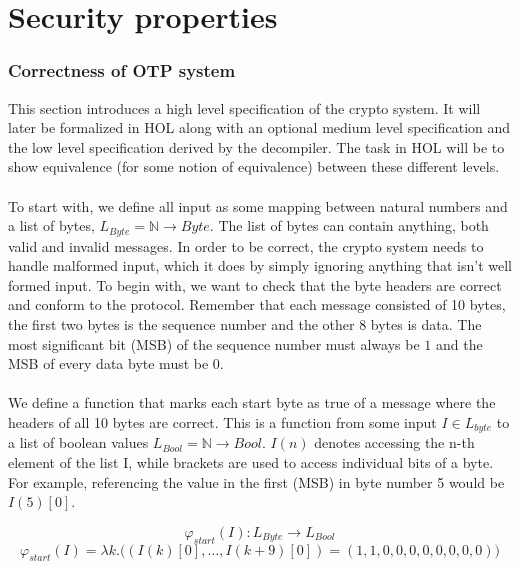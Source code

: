 \documentclass[fleqn]{kththesis}
\begin{document}
\section{Security properties}

\subsubsection{Correctness of OTP system}
This section introduces a high level specification of the crypto system. It will later be formalized in HOL along with an optional medium level specification and the low level specification derived by the decompiler. The task in HOL will be to show equivalence (for some notion of equivalence) between these different levels. 

\paragraph{}
To start with, we define all input as some mapping between natural numbers and a list of bytes, $L_{Byte} = \mathbb{N} \rightarrow Byte$. The list of bytes can contain anything, both valid and invalid messages. In order to be correct, the crypto system needs to handle malformed input, which it does by simply ignoring anything that isn't well formed input. To begin with, we want to check that the byte headers are correct and conform to the protocol. Remember that each message consisted of 10 bytes, the first two bytes is the sequence number and the other 8 bytes is data. The most significant bit (MSB) of the sequence number must always be $1$ and the MSB of every data byte must be $0$.

\paragraph{}
We define a function that marks each start byte as true of a message where the headers of all 10 bytes are correct. This is a function from some input $I \in L_{byte}$ to a list of boolean values $L_{Bool} = \mathbb{N} \rightarrow Bool$. $I(n)$ denotes accessing the n-th element of the list I, while brackets are used to access individual bits of a byte. For example, referencing the value in the first (MSB) in byte number 5 would be $I(5)[0]$.


\begin{equation*}
\varphi_{start}(I) \colon L_{Byte} \rightarrow L_{Bool}
\end{equation*}
\begin{equation*}
\varphi_{start}(I) = \lambda k .\Bigg(
(I(k)[0], \dots ,I(k+9)[0]) = 
(1,1,0,0,0,0,0,0,0,0)\Bigg)
\end{equation*}
	
\end{document}

